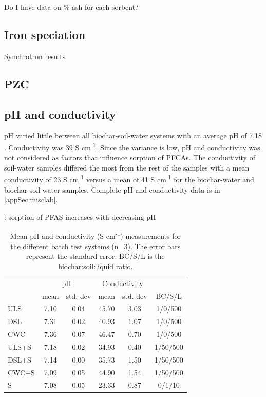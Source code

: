 Do I have data on \% ash for each sorbent?


\subsection{Iron speciation}
Synchrotron results 

\subsection{PZC}

\subsection{pH and conductivity}
pH varied little between all biochar-soil-water systems with an average pH of 7.18 . Conductivity was 39  \textmu S cm\textsuperscript{-1}. Since the variance is low, pH and conductivity was not considered as factors that influence sorption of PFCAs. The conductivity of soil-water samples differed the most from the rest of the samples with a mean conductivity of 23  \textmu S cm\textsuperscript{-1} versus a mean of 41  \textmu S cm\textsuperscript{-1} for the biochar-water and biochar-soil-water samples. Complete pH and conductivity data is in \cref{appSec:misclab}.

\citep{zhang2013sorption}: sorption of PFAS increases with decreasing pH

\begin{table}
\centering
\caption{Mean pH and conductivity (\textmu S cm\textsuperscript{-1}) measurements for the different batch test systems (n=3). The error bars represent the standard error. BC/S/L is the biochar:soil:liquid ratio.}
\label{tab:pHcond}
\begin{tabular}{lccccc}
\toprule
 & \multicolumn{2}{c}{pH} & \multicolumn{2}{c}{Conductivity} & \\ \cline{2-5}
 & mean & std. dev & mean & std. dev & BC/S/L\\ 
\midrule
ULS & 7.10 & 0.04 & 45.70 & 3.03 & 1/0/500\\
DSL & 7.31 & 0.02 & 40.93 & 1.07 & 1/0/500\\
CWC & 7.36 & 0.07 & 46.47 & 0.70 & 1/0/500\\
ULS+S & 7.18 & 0.02 & 34.93 & 0.40 & 1/50/500\\
DSL+S & 7.14 & 0.00 & 35.73 & 1.50 & 1/50/500\\
CWC+S & 7.09 & 0.05 & 44.90 & 1.54 & 1/50/500\\
S & 7.08 & 0.05 & 23.33 & 0.87 & 0/1/10\\
\bottomrule
\end{tabular}
\end{table}



